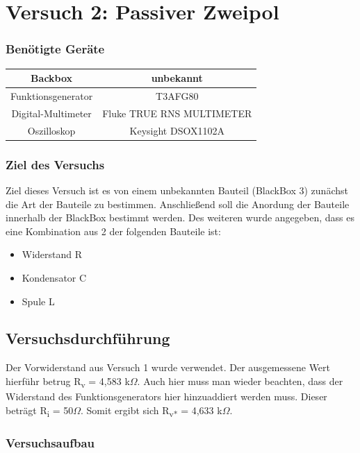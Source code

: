 \chapter{Versuch 2: Passiver Zweipol}
\subsection*{Benötigte Geräte}

\begin{tabular}[h]{c|c}
	Backbox & unbekannt \\
    \hline
    Funktionsgenerator & T3AFG80\\
    \hline
    Digital-Multimeter & Fluke TRUE RNS MULTIMETER\\
    \hline
    Oszilloskop & Keysight DSOX1102A
    \label{tab:Versuch 2: Geräte}
\end{tabular}

\subsection{Ziel des Versuchs}
Ziel dieses Versuch ist es von einem unbekannten Bauteil (BlackBox 3) zunächst
die Art der Bauteile zu bestimmen. Anschließend soll die Anordung der Bauteile
innerhalb der BlackBox bestimmt werden. Des weiteren wurde angegeben, dass es eine
Kombination aus 2 der folgenden Bauteile ist:
\begin{itemize}
    \item Widerstand R
    \item Kondensator C
    \item Spule L
\end{itemize}

\section{Versuchsdurchführung}
Der Vorwiderstand aus Versuch 1 wurde verwendet. Der ausgemessene Wert hierführ
betrug R\textsubscript{v} = 4,583 k$\Omega$. Auch hier muss man wieder beachten, 
dass der Widerstand des Funktionsgenerators hier hinzuaddiert werden muss. 
Dieser beträgt R\textsubscript{i} = 50$\Omega$. Somit ergibt sich 
R\textsubscript{v*} = 4,633 k$\Omega$.

\subsection{Versuchsaufbau}

